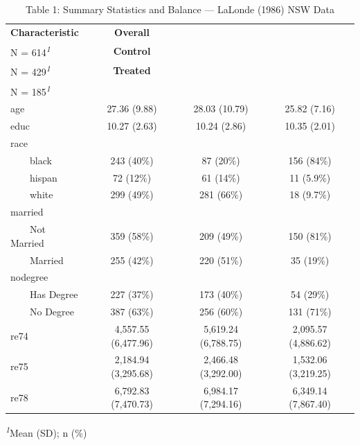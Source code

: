 \begin{table}[t]
\caption*{
{\fontsize{20}{25}\selectfont  Table 1: Summary Statistics and Balance — LaLonde (1986) NSW Data\fontsize{12}{15}\selectfont }
} 
\fontsize{12.0pt}{14.0pt}\selectfont
\begin{tabular*}{\linewidth}{@{\extracolsep{\fill}}lccc}
\toprule
\textbf{Characteristic} & \textbf{Overall}\\
N = 614\textsuperscript{\textit{1}} & \textbf{Control}\\
N = 429\textsuperscript{\textit{1}} & \textbf{Treated}\\
N = 185\textsuperscript{\textit{1}} \\ 
\midrule\addlinespace[2.5pt]
age & 27.36 (9.88) & 28.03 (10.79) & 25.82 (7.16) \\ 
educ & 10.27 (2.63) & 10.24 (2.86) & 10.35 (2.01) \\ 
race &  &  &  \\ 
    black & 243 (40\%) & 87 (20\%) & 156 (84\%) \\ 
    hispan & 72 (12\%) & 61 (14\%) & 11 (5.9\%) \\ 
    white & 299 (49\%) & 281 (66\%) & 18 (9.7\%) \\ 
married &  &  &  \\ 
    Not Married & 359 (58\%) & 209 (49\%) & 150 (81\%) \\ 
    Married & 255 (42\%) & 220 (51\%) & 35 (19\%) \\ 
nodegree &  &  &  \\ 
    Has Degree & 227 (37\%) & 173 (40\%) & 54 (29\%) \\ 
    No Degree & 387 (63\%) & 256 (60\%) & 131 (71\%) \\ 
re74 & 4,557.55 (6,477.96) & 5,619.24 (6,788.75) & 2,095.57 (4,886.62) \\ 
re75 & 2,184.94 (3,295.68) & 2,466.48 (3,292.00) & 1,532.06 (3,219.25) \\ 
re78 & 6,792.83 (7,470.73) & 6,984.17 (7,294.16) & 6,349.14 (7,867.40) \\ 
\bottomrule
\end{tabular*}
\begin{minipage}{\linewidth}
\vspace{.05em}
\textsuperscript{\textit{1}}Mean (SD); n (\%)\\
\end{minipage}
\end{table}

